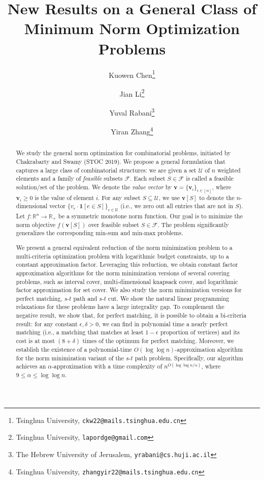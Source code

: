 \documentclass[11pt,a4paper]{article} \usepackage{enumitem}
\title{New Results on a General Class of Minimum Norm Optimization Problems}
\author{
Kuowen Chen\thanks{Tsinghua University, \texttt{ckw22@mails.tsinghua.edu.cn}}
\and
Jian Li\thanks{Tsinghua University, \texttt{lapordge@gmail.com}}
\and
Yuval Rabani\thanks{The Hebrew University of Jerusalem, \texttt{yrabani@cs.huji.ac.il}}
\and
Yiran Zhang\thanks{Tsinghua University, \texttt{zhangyir22@mails.tsinghua.edu.cn}}
}
\date{}
\theoremstyle{definition}
\begin{document}
\maketitle
\begin{abstract}
We study the general norm optimization for combinatorial problems, 
initiated by Chakrabarty and Swamy (STOC 2019).
We propose a general formulation
that captures a large class of combinatorial structures: 
we are given a set $\mathcal{U}$ of $n$ weighted elements
and a family of {\em feasible} subsets $\mathcal{F}$.
Each subset $S\in \mathcal{F}$ is called a feasible solution/set of the problem.
We denote the {\em value vector} by $\boldsymbol{v}=\{\boldsymbol{v}_i\}_{i\in [n]}$,
where $\boldsymbol{v}_i\geq 0$ is the value of element $i$.
For any subset $S\subseteq \mathcal{U}$, we use  
$\boldsymbol{v}[S]$ to denote the $n$-dimensional vector 
$\{v_e\cdot \mathbf{1}[e\in S]\}_{e\in \mathcal{U}}$ (i.e., we zero out
all entries that are not in $S$).
Let $f: \mathbb{R}^n\rightarrow\mathbb{R}_+$ be a symmetric monotone norm function.
Our goal is to minimize the norm objective
$f(\boldsymbol{v}[S])$ 
over feasible subset $S\in \mathcal{F}$.
The problem significantly generalizes the corresponding min-sum and min-max problems.

We present a general equivalent reduction of the norm minimization problem to 
a multi-criteria optimization problem with logarithmic budget constraints, up to 
a constant approximation factor. Leveraging this reduction, we obtain
constant factor approximation algorithms for the norm minimization versions of
several covering problems,
such as interval cover, multi-dimensional knapsack cover, and logarithmic factor approximation
for set cover.
We also study the norm minimization versions for perfect matching, $s$-$t$ path and $s$-$t$ cut.
We show the natural linear programming relaxations for these problems 
have a large integrality gap. To complement the negative result, we show that, for perfect matching, it is possible to 
obtain a bi-criteria result: for any constant $\epsilon,\delta>0$, we can find in polynomial time a nearly perfect matching
(i.e., a matching that matches at least $1-\epsilon$ proportion of vertices)
and its cost is at most $(8+\delta)$ times of the optimum for perfect matching.
Moreover, we establish the existence of a polynomial-time $O(\log\log n)$-approximation algorithm for the norm minimization variant of the $s$-$t$ path problem. Specifically, our algorithm achieves an $\alpha$-approximation with a time complexity of $n^{O(\log\log n / \alpha)}$, where $9 \leq \alpha \leq \log\log n$.
\end{abstract}
\end{document}
